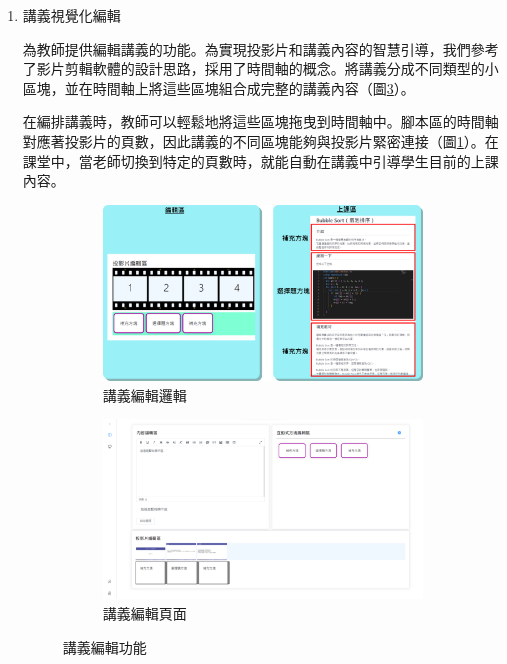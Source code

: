\begin{enumerate}
  \item 講義視覺化編輯
  \par 為教師提供編輯講義的功能。為實現投影片和講義內容的智慧引導，我們參考了影片剪輯軟體的設計思路，採用了時間軸的概念。將講義分成不同類型的小區塊，並在時間軸上將這些區塊組合成完整的講義內容（圖\ref{fig:edit}）。
  \par 在編排講義時，教師可以輕鬆地將這些區塊拖曳到時間軸中。腳本區的時間軸對應著投影片的頁數，因此講義的不同區塊能夠與投影片緊密連接（圖\ref{fig:time}）。在課堂中，當老師切換到特定的頁數時，就能自動在講義中引導學生目前的上課內容。

  \begin{figure}[H]
    \begin{subfigure}{0.5\linewidth}
      \centering
      \includegraphics[width=1\textwidth]{images/timezone.png}
      \caption{講義編輯邏輯}
      \label{fig:time}
    \end{subfigure}
    \begin{subfigure}{0.5\linewidth}
      \centering
      \includegraphics[width=1\textwidth]{images/edit.png}
      \caption{講義編輯頁面}
      \label{fig:edit}
    \end{subfigure}
    \caption{講義編輯功能}
  \end{figure}

\end{enumerate}

